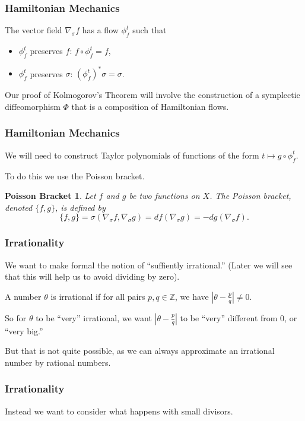 \documentclass{beamer}
\newcommand{\Z}{\mathbb{Z}}
\newcommand{\sgrad}{\nabla_{\sigma}}
\begin{document}
\begin{frame}
  \frametitle{Hamiltonian Mechanics}
  The vector field $\sgrad f$ has a flow $\phi^t_f$ such that
  \begin{itemize}
  \item $\phi^t_f$ preserves $f$: $f \circ \phi^t_f = f$,
  \item $\phi^t_f$ preserves $\sigma$: $(\phi^t_f)^* \sigma = \sigma$.
  \end{itemize}

  Our proof of Kolmogorov's Theorem will involve the construction of a
  symplectic diffeomorphism $\Phi$ that is a composition of Hamiltonian flows.
\end{frame}

\begin{frame}
  \frametitle{Hamiltonian Mechanics}
  We will need to construct Taylor polynomials of functions of the form $t
  \mapsto g \circ \phi^t_f$.

  To do this we use the Poisson bracket.
  \newtheorem{possbrack}{Poisson Bracket}
  \begin{possbrack}
    Let $f$ and $g$ be two functions on $X$.
    The \emph{Poisson bracket}, denoted $\{f, g\}$, is defined by
    \begin{equation*}
      \{f, g\} = \sigma(\sgrad f, \sgrad g) = df(\sgrad g) = - dg(\sgrad f).
    \end{equation*}
  \end{possbrack}
\end{frame}

\begin{frame}
  \frametitle{Irrationality}
  We want to make formal the notion of ``suffiently irrational.''
  (Later we will see that this will help us to avoid dividing by zero).  

  A number $\theta$ is irrational if for all pairs $p, q \in \Z$, we have
  $\left|\theta - \frac{p}{q}\right| \neq 0$.

  So for $\theta$ to be ``very'' irrational, we want $\left|\theta -
    \frac{p}{q}\right|$ to be ``very'' different from $0$, or ``very big.''

  But that is not quite possible, as we can always approximate an irrational
  number by rational numbers.
\end{frame}

\begin{frame}
  \frametitle{Irrationality}
  Instead we want to consider what happens with small divisors.
\end{frame}
\end{document}
